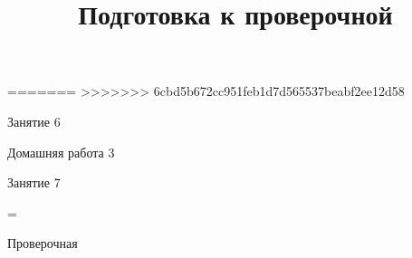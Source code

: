 =======
>>>>>>> 6cbd5b672cc951feb1d7d565537beabf2ee12d58
\begin{class}[number=6]
	\begin{listofex}
		\item Занятие 6
	\end{listofex}
\end{class}

\begin{homework}[number=3]
	\begin{listofex}
		\item Домашняя работа 3
	\end{listofex}
\end{homework}

\begin{class}[number=7]
	\title{Подготовка к проверочной}
	\begin{listofex}
		\item Занятие 7
	\end{listofex}
\end{class}

=%
\begin{exam}
	\begin{listofex}
		\item Проверочная
	\end{listofex}
\end{exam}

